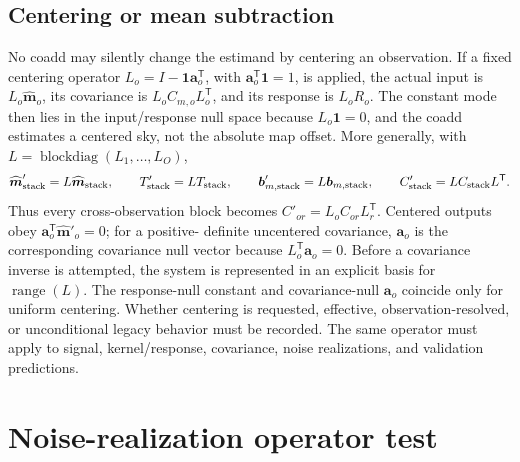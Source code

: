 \documentclass[11pt]{article}
\newcommand{\trans}{\mathsf{T}}
\begin{document}
\subsection{Centering or mean subtraction}

No coadd may silently change the estimand by centering an observation. If a
fixed centering operator
\(L_o=I-\boldsymbol1\boldsymbol a_o^\trans\), with
\(\boldsymbol a_o^\trans\boldsymbol1=1\), is applied, the actual input is
\(L_o\widehat{\boldsymbol m}_o\), its covariance is
\(L_oC_{m,o}L_o^\trans\), and its response is \(L_oR_o\). The constant mode
then lies in the input/response null space because \(L_o\boldsymbol1=0\), and
the coadd estimates a centered sky, not the absolute map offset. More generally, with
\(L=\operatorname{blockdiag}(L_1,\ldots,L_O)\),
\begin{equation}
 \widehat{\boldsymbol m}'_{\rm stack}=L\widehat{\boldsymbol m}_{\rm stack},
 \qquad T'_{\rm stack}=LT_{\rm stack},
 \qquad \boldsymbol b'_{m,\rm stack}=L\boldsymbol b_{m,\rm stack},
 \qquad C'_{\rm stack}=LC_{\rm stack}L^\trans.
 \label{eq:stacked-centering}
\end{equation}
Thus every cross-observation block becomes
\(C'_{or}=L_oC_{or}L_r^\trans\). Centered outputs obey
\(\boldsymbol a_o^\trans\widehat{\boldsymbol m}'_o=0\); for a positive-
definite uncentered covariance, \(\boldsymbol a_o\) is the corresponding
covariance null vector because \(L_o^\trans\boldsymbol a_o=0\). Before a
covariance inverse is attempted, the system is represented in an explicit
basis for \(\operatorname{range}(L)\). The response-null constant and
covariance-null \(\boldsymbol a_o\) coincide only for uniform centering.
Whether centering is requested, effective,
observation-resolved, or unconditional legacy behavior must be recorded. The
same operator must apply to signal, kernel/response, covariance, noise
realizations, and validation predictions.

\section{Noise-realization operator test}
\end{document}
